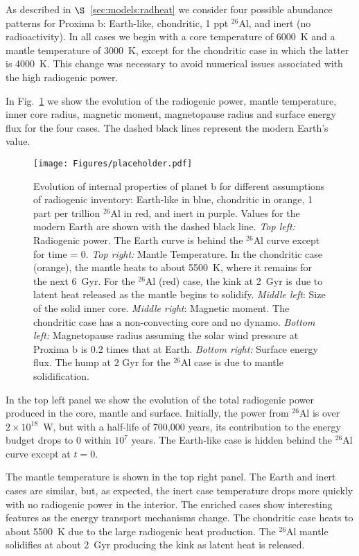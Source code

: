 \documentclass[preprint,12pt]{aastex}
\begin{document}
As described in $\S$~\ref{sec:models:radheat} we consider four
possible abundance patterns for Proxima b: Earth-like, chondritic, 1
ppt $^{26}$Al, and inert (no radioactivity). In all cases we begin with a core
temperature of 6000~K and a mantle temperature of 3000~K, except for
the chondritic case in which the latter is 4000~K. This change was
necessary 
to avoid numerical issues associated with the high
radiogenic power.

In Fig.~\ref{fig:notides} we show the evolution of the radiogenic
power, mantle temperature, inner core radius, magnetic moment,
magnetopause radius and surface energy flux for the four cases. The
dashed black lines represent the modern Earth's value.

\begin{figure}[ht] 
\begin{center}
\texttt{[image: Figures/placeholder.pdf]}
\end{center}
\caption{Evolution of internal properties of planet b for different
  assumptions of radiogenic inventory: Earth-like in blue, chondritic
  in orange, 1 part per trillion $^{26}$Al in red, and inert in
  purple. 
  Values for the modern Earth are shown with the dashed black
  line. {\it Top left:} Radiogenic power. The Earth curve is behind
  the $^{26}$Al curve except for time = 0. {\it Top right:} Mantle
  Temperature. In the chondritic case (orange), the mantle heats to
  about 5500~K, where it remains for the next 6~Gyr. For the $^{26}$Al
  (red) case, the kink at 2~Gyr is due to latent heat released as the
  mantle begins to solidify. {\it Middle left}: Size of the solid
  inner core. {\it Middle right}: Magnetic moment. The chondritic case
  has a non-convecting core and no dynamo. {\it Bottom
    left:} Magnetopause radius assuming the solar wind pressure at Proxima b is
  0.2 times that at Earth. {\it Bottom right:} Surface energy
  flux. The hump at 2 Gyr for the $^{26}$Al case is due to mantle
  solidification.}
\label{fig:notides}
\end{figure}

In the top left panel we show the evolution of the total radiogenic
power produced in the core, mantle and surface. Initially, the
power from $^{26}$Al is over $2 \times 10^{18}$~W, but with a
half-life of 700,000 years, its contribution to the energy budget
drops to 0 within $10^7$ years. The Earth-like case is hidden behind
the $^{26}$Al curve except at $t=0$.

The mantle temperature is shown in the top right
panel. The Earth and inert cases are similar, but, as expected, the
inert case temperature drops more quickly with no
radiogenic power in the interior. The enriched cases show interesting
features as the energy transport mechanisms change. The chondritic
case heats to about 5500~K due to the large radiogenic heat
production. The $^{26}$Al mantle solidifies at about 2~Gyr producing
the kink as latent heat is released.
\end{document}
